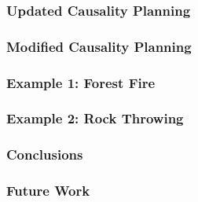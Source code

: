 \documentclass{beamer}
\begin{document}
\begin{frame}
\frametitle{Updated Causality Planning}

\end{frame}



\begin{frame}
\frametitle{Modified Causality Planning}

\end{frame}


\begin{frame}
\frametitle{Example 1: Forest Fire}

\end{frame}


\begin{frame}
\frametitle{Example 2: Rock Throwing}

\end{frame}


\begin{frame}
\frametitle{Conclusions}

\end{frame}


\begin{frame}
\frametitle{Future Work}

\end{frame}
\end{document}
